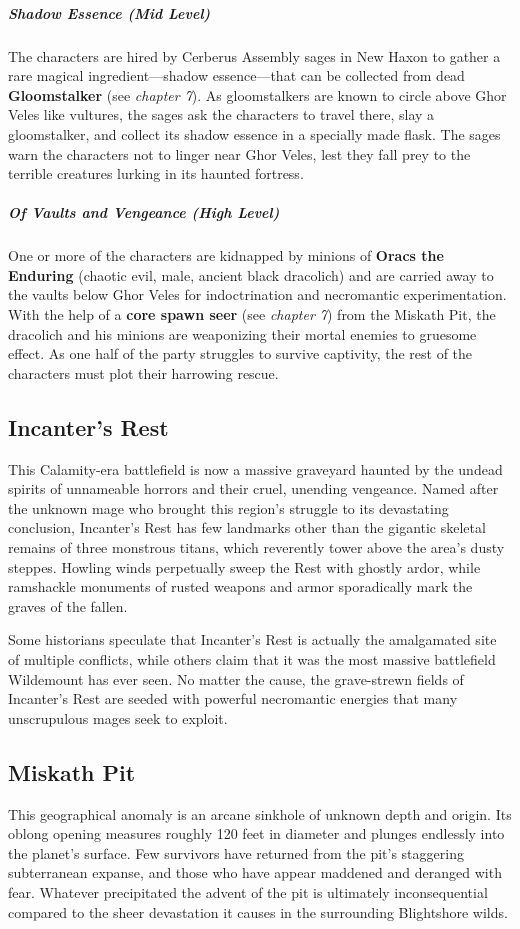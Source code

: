 \documentclass[10pt,a4paper,twoside,bg=print,twocolumn,openany,nodeprecatedcode]{dndbook}
\begin{document}
\subparagraph{Shadow Essence (Mid Level)}
The characters are hired by Cerberus Assembly sages in New Haxon to gather a rare magical ingredient—shadow essence—that can be collected from dead \textbf{Gloomstalker} (see \textit{chapter 7}). As gloomstalkers are known to circle above Ghor Veles like vultures, the sages ask the characters to travel there, slay a gloomstalker, and collect its shadow essence in a specially made flask. The sages warn the characters not to linger near Ghor Veles, lest they fall prey to the terrible creatures lurking in its haunted fortress.

\subparagraph{Of Vaults and Vengeance (High Level)}
One or more of the characters are kidnapped by minions of \textbf{Oracs the Enduring} (chaotic evil, male, ancient black dracolich) and are carried away to the vaults below Ghor Veles for indoctrination and necromantic experimentation. With the help of a \textbf{core spawn seer} (see \textit{chapter 7}) from the Miskath Pit, the dracolich and his minions are weaponizing their mortal enemies to gruesome effect. As one half of the party struggles to survive captivity, the rest of the characters must plot their harrowing rescue.

\subsection{Incanter's Rest}
This Calamity-era battlefield is now a massive graveyard haunted by the undead spirits of unnameable horrors and their cruel, unending vengeance. Named after the unknown mage who brought this region's struggle to its devastating conclusion, Incanter's Rest has few landmarks other than the gigantic skeletal remains of three monstrous titans, which reverently tower above the area's dusty steppes. Howling winds perpetually sweep the Rest with ghostly ardor, while ramshackle monuments of rusted weapons and armor sporadically mark the graves of the fallen.

Some historians speculate that Incanter's Rest is actually the amalgamated site of multiple conflicts, while others claim that it was the most massive battlefield Wildemount has ever seen. No matter the cause, the grave-strewn fields of Incanter's Rest are seeded with powerful necromantic energies that many unscrupulous mages seek to exploit.

\subsection{Miskath Pit}
This geographical anomaly is an arcane sinkhole of unknown depth and origin. Its oblong opening measures roughly 120 feet in diameter and plunges endlessly into the planet's surface. Few survivors have returned from the pit's staggering subterranean expanse, and those who have appear maddened and deranged with fear. Whatever precipitated the advent of the pit is ultimately inconsequential compared to the sheer devastation it causes in the surrounding Blightshore wilds.
\end{document}
